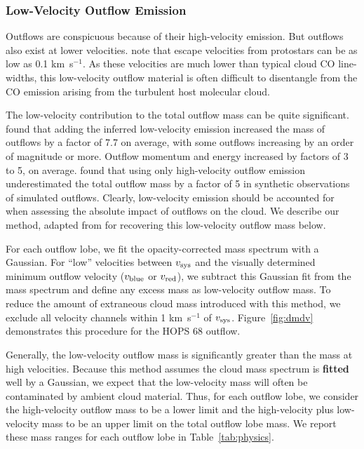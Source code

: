 \documentclass[twocolumn]{aastex63}
\newcommand{\example}{HOPS 68}
\newcommand{\kms}{km~s$^{-1}$}
\begin{document}
\subsubsection{Low-Velocity Outflow Emission}\label{sec:lowvelocity}
Outflows are conspicuous because of their high-velocity emission. But outflows also exist at lower velocities. \citet{Dunham14} note that escape velocities from protostars can be as low as 0.1 \kms. As these velocities are much lower than typical cloud CO line-widths, this low-velocity outflow material is often difficult to disentangle from the CO emission arising from the turbulent host molecular cloud.  

The low-velocity contribution to the total outflow mass can be quite significant. \citet{Dunham14} found that adding the inferred low-velocity emission increased the mass of outflows by a factor of 7.7 on average, with some outflows increasing by an order of magnitude or more. Outflow momentum and energy increased by factors of 3 to 5, on average. \citet{Offner11} found that using only high-velocity outflow emission underestimated the total outflow mass by a factor of 5 in synthetic observations of simulated outflows. Clearly, low-velocity emission should be accounted for when assessing the absolute impact of outflows on the cloud. We describe our method, adapted from \citet{Dunham14} for recovering this low-velocity outflow mass below. 

For each outflow lobe, we fit the opacity-corrected mass spectrum with a Gaussian. For ``low'' velocities between $v_{\rm sys}$ and the visually determined minimum outflow velocity ($v_{\rm blue}$ or $v_{\rm red}$), we subtract this Gaussian fit from the mass spectrum and define any excess mass as low-velocity outflow mass. To reduce the amount of extraneous cloud mass introduced with this method, we exclude all velocity channels within 1 \kms{} of $v_{\rm sys}$. Figure~\ref{fig:dmdv} demonstrates this procedure for the \example{} outflow. 

Generally, the low-velocity outflow mass is significantly greater than the mass at high velocities. Because this method assumes the cloud mass spectrum is \textbf{fitted} well by a Gaussian, we expect that the low-velocity mass will often be contaminated by ambient cloud material. Thus, for each outflow lobe, we consider the high-velocity outflow mass to be a lower limit and the high-velocity plus low-velocity mass to be an upper limit on the total outflow lobe mass. We report these mass ranges for each outflow lobe in Table~\ref{tab:physics}.
\end{document}
